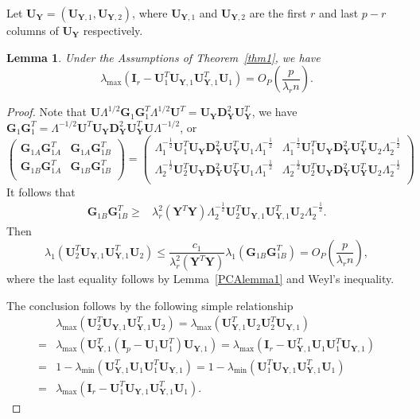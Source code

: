 \documentclass[12pt]{article} %
\newcommand{\bY}{\mathbf{Y}}
\newcommand{\bG}{\mathbf{G}}
\newcommand{\bI}{\mathbf{I}}
\newcommand{\bU}{\mathbf{U}}
\newcommand{\bD}{\mathbf{D}}
\newtheorem{lemma}{Lemma}
\theoremstyle{definition}
\begin{document}
Let $\bU_\bY=(\bU_{\bY,1},\bU_{\bY,2})$, where $\bU_{\bY,1}$ and $\bU_{\bY,2}$ are the first $r$ and last $p-r$ columns of $\bU_\bY$ respectively.
\begin{lemma}\label{PCAlemma2}
    Under the Assumptions of Theorem~\ref{thm1}, we have
$$
\lambda_{\max}(\bI_r-\bU_1^T \bU_{\bY,1}\bU_{\bY,1}^T \bU_1)
=O_P(\frac{ p}{\lambda_r n}).
$$
\end{lemma}
\begin{proof}
    Note that
$
\bU\Lambda^{1/2} \bG_1 \bG_1^T \Lambda^{1/2} \bU^T 
=\bU_{\bY}\bD_{\bY}^2 \bU_{\bY}^T
$,
we have
$
\bG_1 \bG_1^T  
=\Lambda^{-1/2} \bU^T \bU_{\bY}\bD_{\bY}^2 \bU_{\bY}^T \bU\Lambda^{-1/2}
$, or
$$
    \begin{pmatrix}        
        \bG_{1A} \bG_{1A}^T & \bG_{1A}\bG_{1B}^T\\
        \bG_{1B} \bG_{1A}^T & \bG_{1B}\bG_{1B}^T\\
    \end{pmatrix}
    =
    \begin{pmatrix}        
        \Lambda_{1}^{-\frac{1}{2}} \bU_1^T \bU_{\bY}\bD_{\bY}^2 \bU_{\bY}^T \bU_1\Lambda_1^{-\frac{1}{2}}&
        \Lambda_{1}^{-\frac{1}{2}} \bU_1^T \bU_{\bY}\bD_{\bY}^2 \bU_{\bY}^T \bU_2\Lambda_2^{-\frac{1}{2}}\\
        \Lambda_{2}^{-\frac{1}{2}} \bU_2^T \bU_{\bY}\bD_{\bY}^2 \bU_{\bY}^T \bU_1\Lambda_1^{-\frac{1}{2}}&
        \Lambda_{2}^{-\frac{1}{2}} \bU_2^T \bU_{\bY}\bD_{\bY}^2 \bU_{\bY}^T \bU_2\Lambda_2^{-\frac{1}{2}}\\
    \end{pmatrix}
$$
It follows that
$$
\begin{aligned}
\bG_{1B} \bG_{1B}^T  
\geq&
    \lambda_r^2(\bY^T \bY)\Lambda_{2}^{-\frac{1}{2}} \bU_{2}^T \bU_{\bY,1}\bU_{\bY,1}^T \bU_{2}\Lambda_{2}^{-\frac{1}{2}}.
\end{aligned}
$$
Then
$$
\lambda_{1}(\bU_{2}^T \bU_{\bY,1} \bU_{\bY,1}^T \bU_{2})\leq
\frac{c_1}{\lambda_r^2(\bY^T \bY)} \lambda_{1}
(\bG_{1B} \bG_{1B}^T)
=O_P(\frac{p}{\lambda_r n}),
$$
    where the last equality follows by Lemma~\ref{PCAlemma1} and Weyl's inequality.

 The conclusion follows by the following simple relationship
$$
\begin{aligned}
&\lambda_{\max}(\bU_{2}^T \bU_{\bY,1} \bU_{\bY,1}^T \bU_{2})
=
\lambda_{\max}(\bU_{\bY,1}^T \bU_{2} \bU_{2}^T \bU_{\bY,1})\\
=&
    \lambda_{\max}(\bU_{\bY,1}^T (\bI_p-\bU_{1} \bU_{1}^T) \bU_{\bY,1})
    =
\lambda_{\max}(\bI_r-\bU_{\bY,1}^T\bU_{1} \bU_{1}^T \bU_{\bY,1})\\
=&
1-\lambda_{\min}(\bU_{\bY,1}^T\bU_{1} \bU_{1}^T \bU_{\bY,1})
=
1-\lambda_{\min}( \bU_{1}^T \bU_{\bY,1}\bU_{\bY,1}^T\bU_{1})\\
=&
\lambda_{\max}(\bI_r-\bU_{1}^T \bU_{\bY,1}\bU_{\bY,1}^T\bU_{1}).
\end{aligned}
$$
\end{proof}
\end{document}
